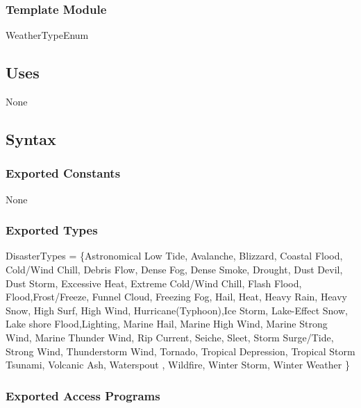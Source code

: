 \documentclass[12pt]{article}
\begin{document}
                \subsubsection*{Template Module}
                
                WeatherTypeEnum
                
                \subsection* {Uses}
                
                None
                
                \subsection* {Syntax}
                
                \subsubsection* {Exported Constants}
                
                None
                
                \subsubsection* {Exported Types}
                DisasterTypes = \{Astronomical Low Tide, Avalanche, Blizzard, Coastal Flood, Cold/Wind Chill, Debris Flow, Dense Fog, 
                Dense Smoke, Drought, Dust Devil, Dust Storm, Excessive Heat, Extreme Cold/Wind Chill, Flash Flood, Flood,Frost/Freeze,
                Funnel Cloud, Freezing Fog, Hail, Heat, Heavy Rain, Heavy Snow, High Surf, High Wind, Hurricane(Typhoon),Ice Storm, 
                Lake-Effect Snow, Lake shore Flood,Lighting, Marine Hail, Marine High Wind, Marine Strong Wind, Marine Thunder Wind, 
                Rip Current, Seiche, Sleet, Storm Surge/Tide, Strong Wind, Thunderstorm Wind, Tornado, Tropical Depression, Tropical Storm
                Tsunami, Volcanic Ash, Waterspout , Wildfire, Winter Storm, Winter Weather  \}\\
                         
                \subsubsection* {Exported Access Programs}
                
\end{document}
